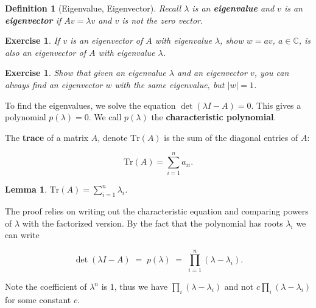 \documentclass[12pt,letterpaper]{report}
\newcommand\be{\begin{equation}}
\newcommand\ee{\end{equation}}
\newcommand{\tbf}[1]{\textbf{#1}}
\newcommand{\C}{\ensuremath{\mathbb{C}}}
\newtheorem{lem}[thm]{Lemma}
\newtheorem{defi}[thm]{Definition}
\newtheorem{exe}[thm]{Exercise}
\begin{document}
\begin{defi}[Eigenvalue, Eigenvector] Recall $\lambda$ is an \tbf{eigenvalue}
and $v$ is an \tbf{eigenvector} if $Av = \lambda v$ and $v$ is not
the zero vector. \end{defi}

\begin{exe} If $v$ is an eigenvector of $A$ with eigenvalue
$\lambda$, show $w = av$, $a \in \C$, is also an eigenvector of
$A$ with eigenvalue $\lambda$. \end{exe}

\begin{exe} Show that given an eigenvalue $\lambda$ and an
eigenvector $v$, you can always find an eigenvector $w$ with the
same eigenvalue, but $|w| = 1$. \end{exe}

To find the eigenvalues, we solve the equation $\det(\lambda I -
A) = 0$. This gives a polynomial $p(\lambda) = 0$. We call
$p(\lambda)$ the \tbf{characteristic polynomial}.




The \tbf{trace} of a matrix $A$, denote $\mbox{Tr}(A)$ is the sum
of the diagonal entries of $A$:

\be \mbox{Tr}(A) = \sum_{i=1}^n a_{ii}. \ee

\begin{lem} $\mbox{Tr}(A) = \sum_{i=1}^n \lambda_i$. \end{lem}

The proof relies on writing out the characteristic equation and
comparing powers of $\lambda$ with the factorized version. By the
fact that the polynomial has roots $\lambda_i$ we can write

\be \det(\lambda I - A) \; = \; p(\lambda) \; = \; \prod_{i=1}^n (
\lambda - \lambda_i). \ee

Note the coefficient of $\lambda^n$ is $1$, thus we have $\prod_i
( \lambda - \lambda_i)$ and not $c \prod_i ( \lambda - \lambda_i)$
for some constant $c$.
\end{document}
